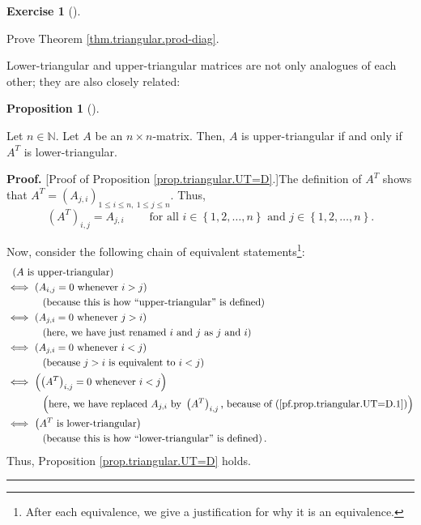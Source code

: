 \documentclass[numbers=enddot,12pt,final,onecolumn,notitlepage]{scrartcl}%
\theoremstyle{definition}
\newtheorem{prop}[theo]{Proposition}
\newenvironment{proposition}[1][]
{\begin{prop}[#1]\begin{leftbar}}
{\end{leftbar}\end{prop}}
\newtheorem{exmp}[theo]{Exercise}
\newenvironment{exercise}[1][]
{\begin{exmp}[#1]\begin{leftbar}}
{\end{leftbar}\end{exmp}}
\newenvironment{proof}[1][Proof]{\noindent\textbf{#1.} }{\ \rule{0.5em}{0.5em}}
\begin{document}
\begin{exercise}
\label{exe.thm.triangular.prod-diag}Prove Theorem
\ref{thm.triangular.prod-diag}.
\end{exercise}

Lower-triangular and upper-triangular matrices are not only analogues of each
other; they are also closely related:

\begin{proposition}
\label{prop.triangular.UT=D}Let $n\in\mathbb{N}$. Let $A$ be an $n\times
n$-matrix. Then, $A$ is upper-triangular if and only if $A^{T}$ is lower-triangular.
\end{proposition}

\begin{proof}
[Proof of Proposition \ref{prop.triangular.UT=D}.]The definition of $A^{T}$
shows that $A^{T}=\left(  A_{j,i}\right)  _{1\leq i\leq n,\ 1\leq j\leq n}$.
Thus,%
\begin{equation}
\left(  A^{T}\right)  _{i,j}=A_{j,i}\ \ \ \ \ \ \ \ \ \ \text{for all }%
i\in\left\{  1,2,\ldots,n\right\}  \text{ and }j\in\left\{  1,2,\ldots
,n\right\}  . \label{pf.prop.triangular.UT=D.1}%
\end{equation}


Now, consider the following chain of equivalent statements\footnote{After each
equivalence, we give a justification for why it is an equivalence.}:%
\begin{align*}
&  \ \left(  A\text{ is upper-triangular}\right) \\
&  \Longleftrightarrow\ \left(  A_{i,j}=0\text{ whenever }i>j\right) \\
&  \ \ \ \ \ \ \ \ \ \ \left(  \text{because this is how \textquotedblleft
upper-triangular\textquotedblright\ is defined}\right) \\
&  \Longleftrightarrow\ \left(  A_{j,i}=0\text{ whenever }j>i\right) \\
&  \ \ \ \ \ \ \ \ \ \ \left(  \text{here, we have just renamed }i\text{ and
}j\text{ as }j\text{ and }i\right) \\
&  \Longleftrightarrow\ \left(  A_{j,i}=0\text{ whenever }i<j\right) \\
&  \ \ \ \ \ \ \ \ \ \ \left(  \text{because }j>i\text{ is equivalent to
}i<j\right) \\
&  \Longleftrightarrow\ \left(  \left(  A^{T}\right)  _{i,j}=0\text{ whenever
}i<j\right) \\
&  \ \ \ \ \ \ \ \ \ \ \left(  \text{here, we have replaced }A_{j,i}\text{ by
}\left(  A^{T}\right)  _{i,j}\text{, because of
(\ref{pf.prop.triangular.UT=D.1})}\right) \\
&  \Longleftrightarrow\ \left(  A^{T}\text{ is lower-triangular}\right) \\
&  \ \ \ \ \ \ \ \ \ \ \left(  \text{because this is how \textquotedblleft
lower-triangular\textquotedblright\ is defined}\right)  .
\end{align*}
Thus, Proposition \ref{prop.triangular.UT=D} holds.
\end{proof}
\end{document}
